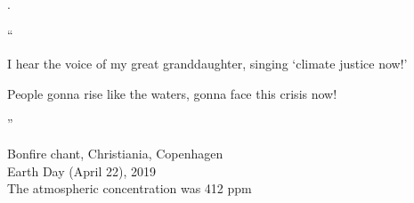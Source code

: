  .
\vspace{5cm}

\Large
``

\begin{center}
I hear the voice of my great granddaughter, singing `climate justice now!'

People gonna rise like the waters, gonna face this crisis now!
\end{center}
\hfill''
\vspace{5cm}
\normalsize
\begin{flushleft}
Bonfire chant, Christiania, Copenhagen\\
Earth Day (April 22), 2019\\
The atmospheric  concentration was 412 ppm
\end{flushleft}
